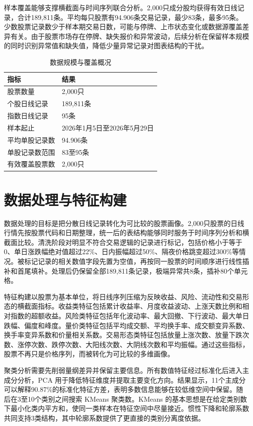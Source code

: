 \documentclass[UTF8,zihao=-4,fontset=windows]{ctexart}
\begin{document}
样本覆盖能够支撑横截面与时间序列联合分析。2,000只成分股均获得有效日线记录，合计189,811条。平均每只股票有94.906条交易记录，最少83条，最多95条。少数股票记录数少于样本期交易日数，可能与停牌、上市状态变化或数据源覆盖差异有关。由于股票市场存在停牌、缺失报价和异常波动，后续分析在保留样本规模的同时识别异常值和缺失值，降低少量异常记录对图表结构的干扰。

\begin{table}[H]
  \centering
  \caption{数据规模与覆盖概况}
  \begin{tabular}{ll}
    \toprule
    指标 & 结果 \\
    \midrule
    股票数量 & 2,000只 \\
    个股日线记录 & 189,811条 \\
    指数日线记录 & 95条 \\
    样本起止 & 2026年1月5日至2026年5月29日 \\
    平均单股记录数 & 94.906条 \\
    单股记录数范围 & 83至95条 \\
    有效覆盖股票数 & 2,000只 \\
    \bottomrule
  \end{tabular}
\end{table}

\section{数据处理与特征构建}
数据处理的目标是把分散日线记录转化为可比较的股票画像。2,000只股票的日线行情先按股票代码和日期整理，统一后的表结构能够同时服务于时间序列分析和横截面比较。清洗阶段对明显不符合交易逻辑的记录进行标记，包括价格小于等于0、单日涨跌幅绝对值超过22\%、日内振幅超过50\%、隔夜价格跳变超过300\%等情况。被标记记录的相关数值字段先置为空值，再按同一股票的时间顺序进行线性插补和首尾填补。处理后仍保留全部189,811条记录，极端异常共8条，插补80个单元格。

特征构建以股票为基本单位，将日线序列压缩为反映收益、风险、流动性和交易形态的横截面指标。收益类特征包括累计收益率、月度收益波动、上涨天数比例和相对指数的超额收益。风险类特征包括年化波动率、最大回撤、下行波动、最大单日跌幅、偏度和峰度。量价类特征包括平均成交额、平均换手率、成交额变异系数、换手率变异系数和价量相关系数。交易形态类特征包括放量上涨次数、放量下跌次数、涨停次数、跌停次数、大阳线次数、大阴线次数和平均振幅。通过这些指标，股票不再只是价格序列，而被转化为可比较的多维画像。

聚类分析需要先削弱量纲差异并保留主要信息。所有数值特征经过标准化后进入主成分分析，PCA 用于降低特征维度并提取主要变化方向。结果显示，11个主成分可以解释90.87\%的标准化特征方差，表明多数信息能够在较低维空间中保留。随后在3至10个类别之间搜索 KMeans 聚类数。KMeans 的基本思想是在给定类别数下最小化类内平方和，使同一类样本在特征空间中尽量接近。惯性下降和轮廓系数共同支持3类结构，其中轮廓系数提供了更直接的类别分离度依据。
\end{document}
